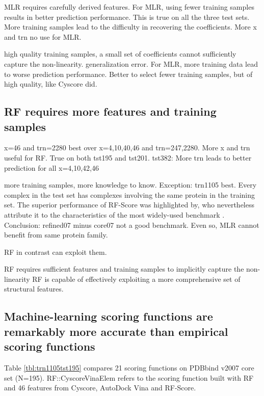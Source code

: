 \documentclass[journal=jacsat,manuscript=article]{achemso}
\begin{document}
MLR requires carefully derived features. For MLR, using fewer training samples results in better prediction performance. This is true on all the three test sets. More training samples lead to the difficulty in recovering the coefficients. More x and trn no use for MLR.

high quality training samples, a small set of coefficients cannot sufficiently capture the non-linearity. generalization error. For MLR, more training data lead to worse prediction performance. Better to select fewer training samples, but of high quality, like Cyscore did.

\subsection{RF requires more features and training samples}

x=46 and trn=2280 best over x={4,10,40,46} and trn={247,2280}. More x and trn useful for RF. True on both tst195 and tst201.
tst382: More trn leads to better prediction for all x=4,10,42,46

more training samples, more knowledge to know.
Exception: trn1105 best. Every complex in the test set has complexes involving the same protein in the training set. The superior performance of RF-Score was highlighted by, who nevertheless attribute it to the characteristics of the most widely-used benchmark \cite{774}. Conclusion: refined07 minus core07 not a good benchmark. Even so, MLR cannot benefit from same protein family.

RF in contrast can exploit them.

RF requires sufficient features and training samples to implicitly capture the non-linearity
RF is capable of effectively exploiting a more comprehensive set of structural features.

\subsection{Machine-learning scoring functions are remarkably more accurate than empirical scoring functions}

Table \ref{tbl:trn1105tst195} compares 21 scoring functions on PDBbind v2007 core set (N=195).
RF::CyscoreVinaElem refers to the scoring function built with RF and 46 features from Cyscore, AutoDock Vina and RF-Score.
\end{document}
